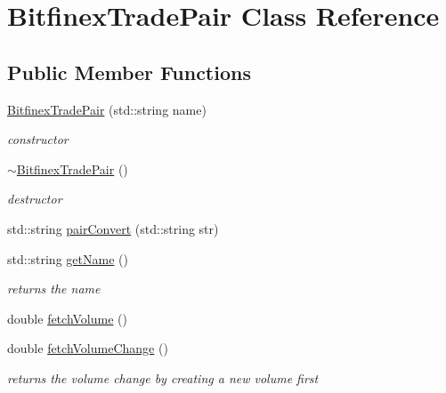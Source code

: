 \hypertarget{class_bitfinex_trade_pair}{}\section{Bitfinex\+Trade\+Pair Class Reference}
\label{class_bitfinex_trade_pair}
\subsection*{Public Member Functions}
\begin{DoxyCompactItemize}
\item 
\mbox{\label{class_bitfinex_trade_pair_a1d82651543f1facdff8fecb86efdf718}} 
\mbox{\hyperlink{class_bitfinex_trade_pair_a1d82651543f1facdff8fecb86efdf718}{Bitfinex\+Trade\+Pair}} (std\+::string name)
\begin{DoxyCompactList}\small\item\em constructor \end{DoxyCompactList}\item 
\mbox{\label{class_bitfinex_trade_pair_ad2a01ffb120afa0939d8d41dc6e34686}} 
\mbox{\hyperlink{class_bitfinex_trade_pair_ad2a01ffb120afa0939d8d41dc6e34686}{$\sim$\+Bitfinex\+Trade\+Pair}} ()
\begin{DoxyCompactList}\small\item\em destructor \end{DoxyCompactList}\item 
std\+::string \mbox{\hyperlink{class_bitfinex_trade_pair_a2c772425f29358b17e38f2c35fcdb69f}{pair\+Convert}} (std\+::string str)
\item 
std\+::string \mbox{\hyperlink{class_bitfinex_trade_pair_ac00dfde40f1d2a1d00bf8054d442bfac}{get\+Name}} ()
\begin{DoxyCompactList}\small\item\em returns the name \end{DoxyCompactList}\item 
double \mbox{\hyperlink{class_bitfinex_trade_pair_a5e9752e1d32db469a3ce368bc1de2886}{fetch\+Volume}} ()
\item 
double \mbox{\hyperlink{class_bitfinex_trade_pair_ac87f08ef5793dbb17b04798227400aab}{fetch\+Volume\+Change}} ()
\begin{DoxyCompactList}\small\item\em returns the volume change by creating a new volume first \end{DoxyCompactList}\item 

\end{DoxyCompactItemize}
